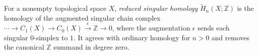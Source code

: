 
For a nonempty topological space $X$, \emph{reduced singular homology} $\widetilde H_n(X;\mathbb Z)$ is the homology of the augmented singular chain complex $\cdots\to C_1(X)\to C_0(X)\xrightarrow{\epsilon}\mathbb Z\to0$, where the augmentation $\epsilon$ sends each singular $0$-simplex to $1$. It agrees with ordinary homology for $n>0$ and removes the canonical $\mathbb Z$ summand in degree zero.
